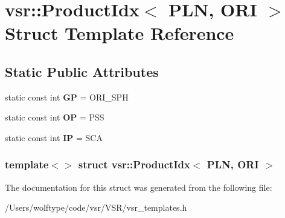 \hypertarget{structvsr_1_1_product_idx_3_01_p_l_n_00_01_o_r_i_01_4}{\section{vsr\-:\-:Product\-Idx$<$ P\-L\-N, O\-R\-I $>$ Struct Template Reference}
\label{structvsr_1_1_product_idx_3_01_p_l_n_00_01_o_r_i_01_4}
}
\subsection*{Static Public Attributes}
\begin{DoxyCompactItemize}
\item 
\hypertarget{structvsr_1_1_product_idx_3_01_p_l_n_00_01_o_r_i_01_4_a59828dd3e9295863f080676f9eb95828}{static const int {\bfseries G\-P} = O\-R\-I\-\_\-\-S\-P\-H}\label{structvsr_1_1_product_idx_3_01_p_l_n_00_01_o_r_i_01_4_a59828dd3e9295863f080676f9eb95828}

\item 
\hypertarget{structvsr_1_1_product_idx_3_01_p_l_n_00_01_o_r_i_01_4_af742bbdd32a6174652c2c14fd882e113}{static const int {\bfseries O\-P} = P\-S\-S}\label{structvsr_1_1_product_idx_3_01_p_l_n_00_01_o_r_i_01_4_af742bbdd32a6174652c2c14fd882e113}

\item 
\hypertarget{structvsr_1_1_product_idx_3_01_p_l_n_00_01_o_r_i_01_4_ad79b3d69ecebeb83a2a6c590f9d37ed2}{static const int {\bfseries I\-P} = S\-C\-A}\label{structvsr_1_1_product_idx_3_01_p_l_n_00_01_o_r_i_01_4_ad79b3d69ecebeb83a2a6c590f9d37ed2}

\end{DoxyCompactItemize}
\subsubsection*{template$<$$>$ struct vsr\-::\-Product\-Idx$<$ P\-L\-N, O\-R\-I $>$}



The documentation for this struct was generated from the following file\-:\begin{DoxyCompactItemize}
\item 
/\-Users/wolftype/code/vsr/\-V\-S\-R/vsr\-\_\-templates.\-h\end{DoxyCompactItemize}
